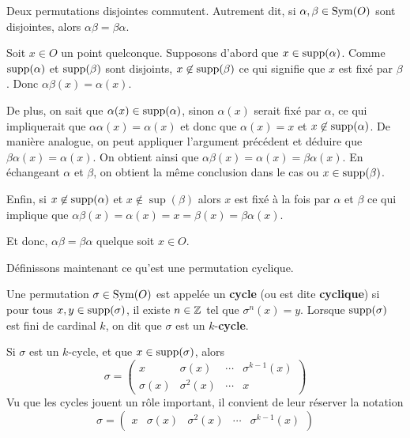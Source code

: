 \documentclass[french]{book}
\begin{document}
\begin{proposition}
  Deux permutations disjointes commutent. Autrement dit, si $\alpha, \beta \in \operatorname{Sym}(O)$ sont disjointes, alors $\alpha \beta = \beta \alpha$.

  \tcblower
  \begin{preuve}
    Soit $x \in O$ un point quelconque. Supposons d'abord que $x \in \operatorname{supp}(\alpha)$. Comme $\operatorname{supp}(\alpha)$ et $\operatorname{supp}(\beta)$ sont disjoints, $x \not \in \operatorname{supp}(\beta)$ ce qui signifie que $x$ est fixé par $\beta$. Donc $\alpha \beta(x) = \alpha(x)$.
    \par De plus, on sait que $\alpha(x) \in \operatorname{supp}(\alpha)$, sinon $\alpha(x)$ serait fixé par $\alpha$, ce qui impliquerait que $\alpha \alpha(x) = \alpha(x)$ et donc que $\alpha(x) = x$ et $x \not \in \operatorname{supp}(\alpha)$. De manière analogue, on peut appliquer l'argument précédent et déduire que $\beta \alpha(x) = \alpha(x)$. On obtient ainsi que $\alpha \beta(x) = \alpha(x) = \beta \alpha(x)$. En échangeant $\alpha$ et $\beta$, on obtient la même conclusion dans le cas ou $x \in \operatorname{supp}(\beta)$.
    \par Enfin, si $x \not \in \operatorname{supp}(\alpha)$ et $x \not \in \sup(\beta)$ alors $x$ est fixé à la fois par $\alpha$ et $\beta$ ce qui implique que $\alpha \beta(x) = \alpha(x) = x = \beta(x) = \beta \alpha(x)$.
    \par Et donc, $\alpha \beta = \beta \alpha$ quelque soit $x \in  O$.
  \end{preuve}
\end{proposition}
Définissons maintenant ce qu'est une permutation cyclique.
\begin{definition}
  Une permutation $\sigma \in \operatorname{Sym}(O)$ est appelée un \textbf{cycle} (ou est dite \textbf{cyclique}) si pour tous $x, y \in \operatorname{supp}(\sigma)$, il existe $n \in \mathbb{Z}$ tel que $\sigma^n(x) = y$.
  \newline Lorsque $\operatorname{supp}(\sigma)$ est fini de cardinal $k$, on dit que $\sigma$ est un $k$-\textbf{cycle}.
\end{definition}

\begin{remarque}
  Si $\sigma$ est un $k$-cycle, et que $x \in \operatorname{supp}(\sigma)$, alors
  $$\sigma = \begin{pmatrix}
    x & \sigma(x) & \cdots & \sigma^{k-1}(x) \\
    \sigma(x) & \sigma^2(x) & \cdots & x
  \end{pmatrix}$$
  Vu que les cycles jouent un rôle important, il convient de leur réserver la notation
  $$\sigma = \begin{pmatrix} x & \sigma(x) & \sigma^2(x) & \cdots & \sigma^{k-1}(x) \end{pmatrix}$$
\end{remarque}
\end{document}
